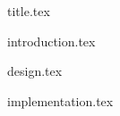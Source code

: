 \documentclass[a4paper,12pt]{article}
\begin{document}
{title.tex}

\newpage



\newpage
\vfill
\tableofcontents
\vfill
\newpage
\listoffigures

\newpage
{}



{introduction.tex}


{design.tex}

{implementation.tex}
\end{document}
